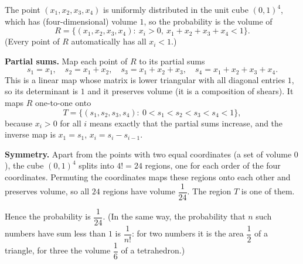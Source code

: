 The point $(x_1,x_2,x_3,x_4)$ is uniformly distributed in the unit cube $(0,1)^4$, which has (four-dimensional) volume $1$, so the probability is the volume of
\[R=\{(x_1,x_2,x_3,x_4):\ x_i>0,\ x_1+x_2+x_3+x_4<1\}.\]
(Every point of $R$ automatically has all $x_i<1$.)

\textbf{Partial sums.} Map each point of $R$ to its partial sums
\[s_1=x_1,\quad s_2=x_1+x_2,\quad s_3=x_1+x_2+x_3,\quad s_4=x_1+x_2+x_3+x_4.\]
This is a linear map whose matrix is lower triangular with all diagonal entries $1$, so its determinant is $1$ and it preserves volume (it is a composition of shears). It maps $R$ one-to-one onto
\[T=\{(s_1,s_2,s_3,s_4):\ 0<s_1<s_2<s_3<s_4<1\},\]
because $x_i>0$ for all $i$ means exactly that the partial sums increase, and the inverse map is $x_1=s_1$, $x_i=s_i-s_{i-1}$.

\textbf{Symmetry.} Apart from the points with two equal coordinates (a set of volume $0$), the cube $(0,1)^4$ splits into $4!=24$ regions, one for each order of the four coordinates. Permuting the coordinates maps these regions onto each other and preserves volume, so all $24$ regions have volume $\dfrac{1}{24}$. The region $T$ is one of them.

Hence the probability is $\boxed{\dfrac{1}{24}}$. (In the same way, the probability that $n$ such numbers have sum less than $1$ is $\dfrac{1}{n!}$: for two numbers it is the area $\dfrac12$ of a triangle, for three the volume $\dfrac16$ of a tetrahedron.)
